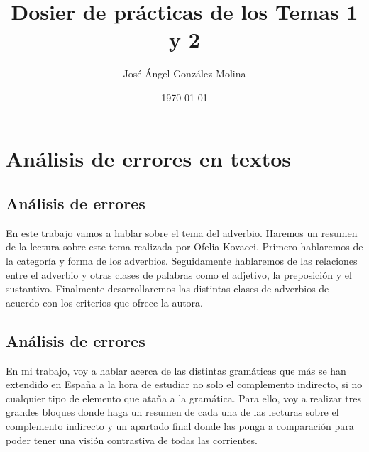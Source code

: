 \documentclass[12pt, a4paper, oneside]{report}
\title{Dosier de prácticas de los Temas 1 y 2}
\author{José Ángel González Molina}
\date{\today}
\begin{document}
    \color{negro}
    \maketitle
    \clearpage

    \chapter{Análisis de errores en textos}
    \section{Análisis de errores}
    En este trabajo vamos a hablar %
     sobre el tema del adverbio. Haremos un resumen %
de la lectura sobre este tema realizada por
Ofelia Kovacci. Primero hablaremos de la %
categoría y forma de los adverbios.
Seguidamente %
hablaremos %
de
las
relaciones entre el adverbio y otras clases
de
palabras
como
el
adjetivo,
la
preposición y el sustantivo. Finalmente %
desarrollaremos las distintas clases de
adverbios de acuerdo con los criterios que
ofrece la autora.

\section{Análisis de errores}

En mi trabajo, voy a hablar acerca %
  de las distintas gramáticas que más se han extendido en España %
  a la hora de estudiar
no solo el complemento indirecto, si no %
cualquier tipo de elemento que ataña a la gramática.
Para ello, voy a realizar %
tres grandes bloques %
donde haga un resumen de cada una de las lecturas sobre el
complemento indirecto y un apartado ﬁnal %
donde las ponga a comparación para poder
tener una visión contrastiva de todas las
corrientes.
\end{document}
